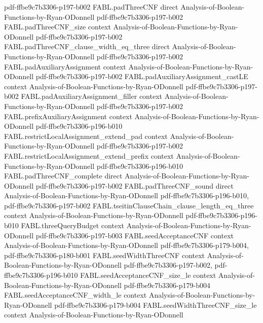 \begin{theorem}
  {pdf-ffbe9c7b3306-p197-b002}
\proofstep
  {FABL.padThreeCNF}
  {direct}
  {Analysis-of-Boolean-Functions-by-Ryan-ODonnell}
  {pdf-ffbe9c7b3306-p197-b002}
\proofstep
  {FABL.padThreeCNF_size}
  {context}
  {Analysis-of-Boolean-Functions-by-Ryan-ODonnell}
  {pdf-ffbe9c7b3306-p197-b002}
\proofstep
  {FABL.padThreeCNF_clause_width_eq_three}
  {direct}
  {Analysis-of-Boolean-Functions-by-Ryan-ODonnell}
  {pdf-ffbe9c7b3306-p197-b002}
\proofstep
  {FABL.padAuxiliaryAssignment}
  {context}
  {Analysis-of-Boolean-Functions-by-Ryan-ODonnell}
  {pdf-ffbe9c7b3306-p197-b002}
\proofstep
  {FABL.padAuxiliaryAssignment_castLE}
  {context}
  {Analysis-of-Boolean-Functions-by-Ryan-ODonnell}
  {pdf-ffbe9c7b3306-p197-b002}
\proofstep
  {FABL.padAuxiliaryAssignment_filler}
  {context}
  {Analysis-of-Boolean-Functions-by-Ryan-ODonnell}
  {pdf-ffbe9c7b3306-p197-b002}
\proofstep
  {FABL.prefixAuxiliaryAssignment}
  {context}
  {Analysis-of-Boolean-Functions-by-Ryan-ODonnell}
  {pdf-ffbe9c7b3306-p196-b010}
\proofstep
  {FABL.restrictLocalAssignment_extend_pad}
  {context}
  {Analysis-of-Boolean-Functions-by-Ryan-ODonnell}
  {pdf-ffbe9c7b3306-p197-b002}
\proofstep
  {FABL.restrictLocalAssignment_extend_prefix}
  {context}
  {Analysis-of-Boolean-Functions-by-Ryan-ODonnell}
  {pdf-ffbe9c7b3306-p196-b010}
\proofstep
  {FABL.padThreeCNF_complete}
  {direct}
  {Analysis-of-Boolean-Functions-by-Ryan-ODonnell}
  {pdf-ffbe9c7b3306-p197-b002}
\proofstep
  {FABL.padThreeCNF_sound}
  {direct}
  {Analysis-of-Boolean-Functions-by-Ryan-ODonnell}
  {pdf-ffbe9c7b3306-p196-b010,
    pdf-ffbe9c7b3306-p197-b002}
\proofstep
  {FABL.tseitinClauseChain_clause_length_eq_three}
  {context}
  {Analysis-of-Boolean-Functions-by-Ryan-ODonnell}
  {pdf-ffbe9c7b3306-p196-b010}
\proofstep
  {FABL.threeQueryBudget}
  {context}
  {Analysis-of-Boolean-Functions-by-Ryan-ODonnell}
  {pdf-ffbe9c7b3306-p197-b003}
\proofstep
  {FABL.seedAcceptanceCNF}
  {context}
  {Analysis-of-Boolean-Functions-by-Ryan-ODonnell}
  {pdf-ffbe9c7b3306-p179-b004,
    pdf-ffbe9c7b3306-p180-b001}
\proofstep
  {FABL.seedWidthThreeCNF}
  {context}
  {Analysis-of-Boolean-Functions-by-Ryan-ODonnell}
  {pdf-ffbe9c7b3306-p197-b002,
    pdf-ffbe9c7b3306-p196-b010}
\proofstep
  {FABL.seedAcceptanceCNF_size_le}
  {context}
  {Analysis-of-Boolean-Functions-by-Ryan-ODonnell}
  {pdf-ffbe9c7b3306-p179-b004}
\proofstep
  {FABL.seedAcceptanceCNF_width_le}
  {context}
  {Analysis-of-Boolean-Functions-by-Ryan-ODonnell}
  {pdf-ffbe9c7b3306-p179-b004}
\proofstep
  {FABL.seedWidthThreeCNF_size_le}
  {context}
  {Analysis-of-Boolean-Functions-by-Ryan-ODonnell}

\end{theorem}
